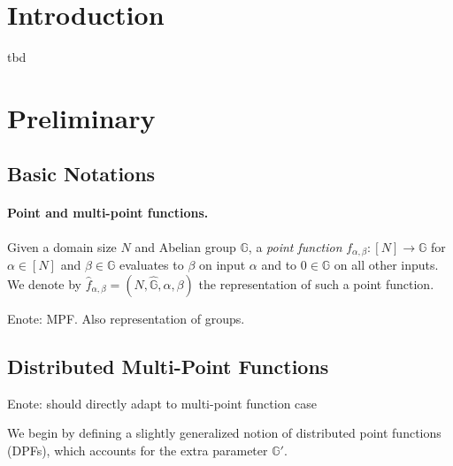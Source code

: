 \documentclass[sigconf]{acmart}
\newcommand{\Enote}[1]{\color{purple}Enote: #1\color{black}}
\newcommand{\GG}{\mathbb{G}}
\begin{document}
\section{Introduction}
tbd

\section{Preliminary}
\subsection{Basic Notations}



 \paragraph{Point and multi-point functions.} Given a domain size $N$ and Abelian group $\GG$, a \emph{point function} $f_{\alpha,\beta}:[N]\rightarrow\GG$ for $\alpha\in[N]$ and $\beta\in\GG$ evaluates to $\beta$ on input $\alpha$ and to $0\in\GG$ on all other inputs. We denote by $\hat{f}_{\alpha,\beta}=(N,\hat{\GG},\alpha,\beta)$ the representation of such a point function.
 
\Enote{MPF. Also representation of groups.}
 
\subsection{Distributed Multi-Point Functions}

\Enote{should directly adapt to multi-point function case}

We begin by defining a slightly generalized notion of distributed point functions (DPFs), which accounts for the extra parameter $\GG'$.
\end{document}
